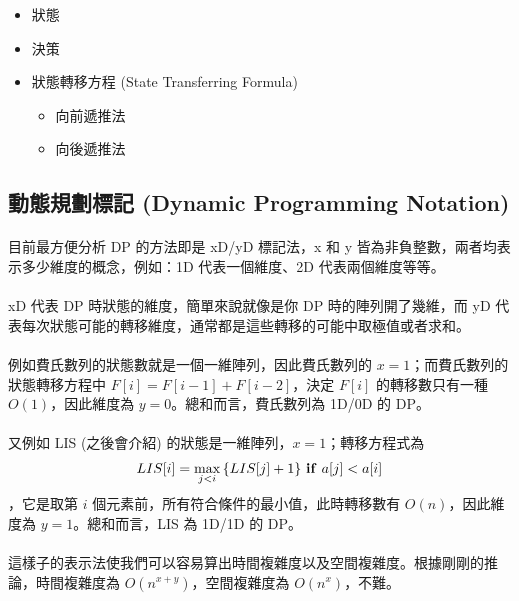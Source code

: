 \documentclass[12pt,a4paper,oneside]{report}
\begin{document}
\begin{CJK}{UTF8}{bkai}
\begin{itemize}
\item 狀態
\item 決策
\item 狀態轉移方程 (State Transferring Formula)
  \begin{itemize}
  \item 向前遞推法
  \item 向後遞推法
  \end{itemize}
\end{itemize}

\subsection{動態規劃標記 (Dynamic Programming Notation)}

\paragraph{}目前最方便分析 DP 的方法即是 xD/yD 標記法，x 和 y 皆為非負整數，兩者均表示多少維度的概念，例如：1D 代表一個維度、2D 代表兩個維度等等。
\paragraph{}xD 代表 DP 時狀態的維度，簡單來說就像是你 DP 時的陣列開了幾維，而 yD 代表每次狀態可能的轉移維度，通常都是這些轉移的可能中取極值或者求和。
\paragraph{}例如費氏數列的狀態數就是一個一維陣列，因此費氏數列的 $x=1$；而費氏數列的狀態轉移方程中 $F[i]=F[i-1]+F[i-2]$，決定 $F[i]$ 的轉移數只有一種 $O(1)$，因此維度為 $y=0$。總和而言，費氏數列為 1D/0D 的 DP。
\paragraph{}又例如 LIS (之後會介紹) 的狀態是一維陣列，$x=1$；轉移方程式為
\begin{align*}
LIS[i] = \max_{j<i}{\{LIS[j]+1\}}\text{ \textbf{if} }a[j]<a[i]
\end{align*}
，它是取第 $i$ 個元素前，所有符合條件的最小值，此時轉移數有 $O(n)$，因此維度為 $y=1$。總和而言，LIS 為 1D/1D 的 DP。
\paragraph{}這樣子的表示法使我們可以容易算出時間複雜度以及空間複雜度。根據剛剛的推論，時間複雜度為 $O(n^{x+y})$，空間複雜度為 $O(n^{x})$，不難。


\end{CJK}
\end{document}
